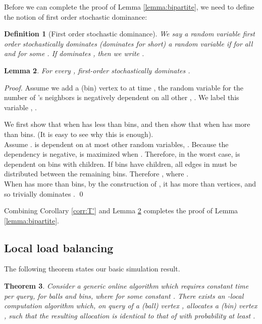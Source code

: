 \documentclass[english, oribibl]{llncs}
\newtheorem{theorem}{Theorem}[section]
\newtheorem{lemma}[theorem]{Lemma}
\newtheorem{definition}[theorem]{Definition}
\begin{document}
Before we can complete the proof of Lemma \ref{lemma:bipartite}, we need to define the notion of first order stochastic dominance:

\begin{definition}[First order stochastic dominance]
We say a random variable  \emph{first order stochastically dominates} (\emph{dominates} for short)
a random variable  if  for all  and  for some .
If  dominates , then we write .
\end{definition}
\begin{lemma}
\label{lemma:stochastic dominance}
For every ,  first-order stochastically dominates . \end{lemma}

\begin{proof}
Assume we add a (bin) vertex  to  at time , the random variable for the number of 's neighbors
is negatively dependent on all other , . We label this variable , . 

We first show that  when  has less than  bins, and then show that  when  has more than  bins. (It is easy to see why this is enough).\\
Assume .  is dependent on at most  other random variables, . Because the dependency is negative,   is maximized when . Therefore, in the worst case,  is dependent on  bins with  children. If  bins have  children, all edges in  must be distributed between the remaining bins. Therefore , where .\\
When  has more than  bins, by the construction of , it has more than  vertices, and so  trivially dominates . \qed
\end{proof}

Combining Corollary \ref{corr:T'} and Lemma \ref{lemma:stochastic dominance} completes the proof of Lemma \ref{lemma:bipartite}. 
\subsection{Local load balancing}
The following theorem states our basic simulation result.

\begin{theorem}\label{thm:local_bb}
Consider a generic online algorithm  which requires constant time per query, for  balls and  bins, where  for some constant .
There exists an
-local computation algorithm
which, on query of a (ball) vertex ,
allocates  a (bin) vertex , such that the resulting allocation is identical to that of  with probability at least .
\end{theorem}
\end{document}
